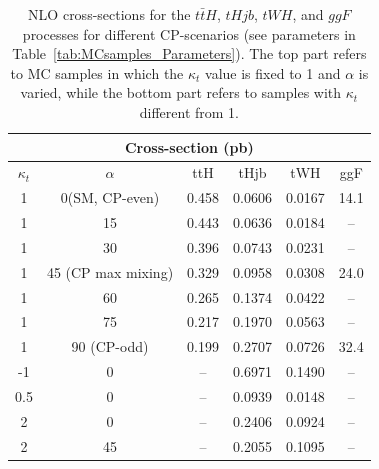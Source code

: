 \begin{table}[h!]
  \centering
  \begin{tabular}{|c|c||c|c|c|c|}
    \hline
    \multicolumn{6}{|c|}{Cross-section (pb)} \\
    \hline \hline
    $\kappa_t$ & $\alpha$ & ttH & tHjb & tWH & ggF\\
    \hline
    1 & 0(SM, CP-even) & 0.458 & 0.0606 & 0.0167 & 14.1\\
    1 & 15 & 0.443 & 0.0636 & 0.0184 & --\\
    1 & 30 & 0.396 & 0.0743 & 0.0231 & --\\
    1 & 45 (CP max mixing)& 0.329 & 0.0958 & 0.0308 & 24.0\\
    1 & 60 & 0.265 & 0.1374 & 0.0422 & --\\
    1 & 75 & 0.217 & 0.1970 & 0.0563 & --\\
    1 & 90 (CP-odd) & 0.199 & 0.2707 & 0.0726 & 32.4\\
    \hline \hline
    -1 & 0 & -- & 0.6971 & 0.1490 & -- \\
    0.5 & 0 & -- & 0.0939 & 0.0148 & -- \\
    2 & 0 & -- & 0.2406 & 0.0924 & -- \\
    2 & 45 & -- & 0.2055 & 0.1095 & -- \\
    \hline
  \end{tabular}
  \caption{NLO cross-sections for the $t\bar{t}H$, $tHjb$, $tWH$, and $ggF$ processes for different CP-scenarios (see parameters in Table~\ref{tab:MCsamples_Parameters}). The top part refers to MC samples in which the $\kappa_{t}$ value is fixed to 1 and $\alpha$ is varied, while the bottom part refers to samples with $\kappa_{t}$ different from 1.}
  \label{tab:MCsamples_XS}
\end{table}

